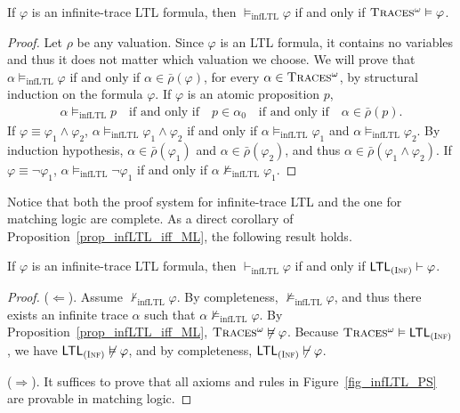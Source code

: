 \documentclass[acmsmall]{acmart}
\newcommand{\barrho}{\bar{\rho}}
\newcommand{\infTraces}{\textsc{Traces$^\omega$}\xspace}
\newcommand{\MLLTL}{\textnormal{\textsf{LTL}}\xspace}
\newcommand{\MLinfLTL}{\MLLTL_\Inf}
\newcommand{\textiff}{\quad \text{if and only if} \quad}
\newcommand{\prule}[1]{\textnormal{(\textsc{#1})}}
\newcommand{\Inf}{\prule{Inf}\xspace}
\newcommand{\infLTL}{\mathrm{infLTL}}
\begin{document}
\begin{proposition}
\label{prop_infLTL_iff_ML}
If $\varphi$ is an infinite-trace LTL formula, 
then $\vDash_\infLTL \varphi$ if and only if
$\infTraces \vDash \varphi$.
\end{proposition}
\begin{proof}
Let $\rho$ be any valuation.
Since $\varphi$ is an LTL formula, it contains no variables
and thus it does not matter which valuation we choose.
We will prove that
$\alpha \vDash_\infLTL \varphi$ if and only if
$\alpha \in \barrho(\varphi)$, for every $\alpha \in \infTraces$,
by structural induction on the formula $\varphi$.
If $\varphi$ is an atomic proposition $p$,
\begin{align*}
\alpha \vDash_\infLTL p \textiff
p \in \alpha_0 \textiff
\alpha \in \barrho(p).
\end{align*}
If $\varphi \equiv \varphi_1 \wedge \varphi_2$,
$\alpha \vDash_\infLTL \varphi_1 \wedge \varphi_2$
if and only if
$\alpha \vDash_\infLTL \varphi_1$ and
$\alpha \vDash_\infLTL \varphi_2$.
By induction hypothesis,
$\alpha \in \barrho(\varphi_1)$
and $\alpha \in \barrho(\varphi_2)$,
and thus $\alpha \in \barrho(\varphi_1 \wedge \varphi_2)$.
If $\varphi \equiv \neg \varphi_1$,
$\alpha \vDash_\infLTL \neg \varphi_1$
if and only if
$\alpha \not\vDash_\infLTL \varphi_1$.
\end{proof}

Notice that both the proof system for infinite-trace LTL
and the one for matching logic are complete.
As a direct corollary of 
Proposition~\ref{prop_infLTL_iff_ML},
the following result holds.

\begin{theorem}
If $\varphi$ is an infinite-trace LTL formula, 
then $\vdash_\infLTL \varphi$ if and only if
$\MLinfLTL \vdash \varphi$.
\label{thm_csrvext_infLTL}
\end{theorem}
\begin{proof}
($\Longleftarrow$).
Assume $\not\vdash_\infLTL \varphi$.
By completeness, $\not\vDash_\infLTL \varphi$,
and thus there exists an infinite trace $\alpha$ such that
$\alpha \not\vDash_\infLTL \varphi$.
By Proposition~\ref{prop_infLTL_iff_ML},
$\infTraces \not\vDash \varphi$.
Because $\infTraces \vDash \MLinfLTL$,
we have $\MLinfLTL \not\vDash \varphi$,
and by completeness,
$\MLinfLTL \not\vdash \varphi$.

($\Longrightarrow$).
It suffices to prove that all axioms and rules in 
Figure~\ref{fig_infLTL_PS} are provable in matching logic.
\end{proof}
\end{document}
